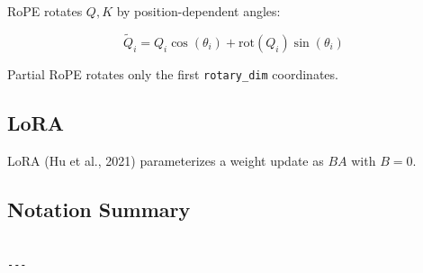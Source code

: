 RoPE rotates $Q, K$ by position-dependent angles:

\[
\tilde{Q}_i = Q_i \cos(\theta_i) + \text{rot}(Q_i) \sin(\theta_i)
\tag{3.8}
\]

Partial RoPE rotates only the first \texttt{rotary\_dim} coordinates.

\subsection{LoRA}

LoRA (Hu et al., 2021) parameterizes a weight update as $BA$ with $B = 0$.

\subsection{Notation Summary}

\begin{lstlisting}

---
\end{lstlisting}